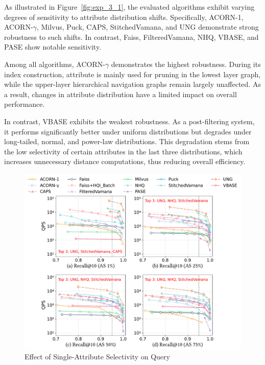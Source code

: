 \documentclass[sigconf, nonacm]{acmart}
\begin{document}
\begin{sloppypar}
As illustrated in Figure~\ref{fig:exp_3_1}, the evaluated algorithms exhibit varying degrees of sensitivity to attribute distribution shifts. Specifically, ACORN-1, ACORN-$\gamma$, Milvus, Puck, CAPS, StitchedVamana, and UNG demonstrate strong robustness to such shifts. In contrast, Faiss, FilteredVamana, NHQ, VBASE, and PASE show notable sensitivity.

Among all algorithms, ACORN-\(\gamma\) demonstrates the highest robustness. During its index construction, attribute is mainly used for pruning in the lowest layer graph, while the upper-layer hierarchical navigation graphs remain largely unaffected. As a result, changes in attribute distribution have a limited impact on overall performance.

In contrast, VBASE exhibits the weakest robustness. As a post-filtering system, it performs significantly better under uniform distributions but degrades under long-tailed, normal, and power-law distributions. This degradation stems from the low selectivity of certain attributes in the last three distributions, which increases unnecessary distance computations, thus reducing overall efficiency.

\begin{figure}
    \centering
    \setlength{\abovecaptionskip}{0cm}
    \setlength{\belowcaptionskip}{-0.1cm}
    \includegraphics[width=\columnwidth]{figures/exp/exp_5_1_1_SingleLabel_1thread.pdf}
    \caption{Effect of Single-Attribute Selectivity on Query}
    \label{fig:exp_5_1_1_SingleLabel_1thread}
\end{figure}



\end{sloppypar}
\end{document}
